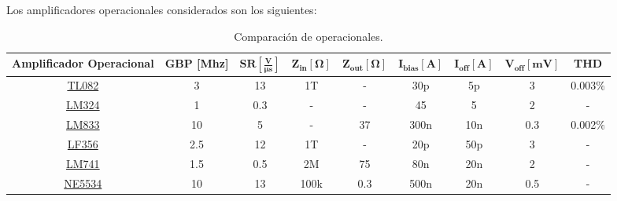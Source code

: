 Los amplificadores operacionales considerados son los siguientes:
\begin{table}[H]
\hspace*{-0.5cm}
\begin{tabular}{ccccccccc}
\hline
\textbf{Amplificador Operacional} & \textbf{GBP [Mhz]} & $\mathbf{SR [\frac{V}{\mu s}]}$ & $\mathbf{Z_{in} [\Omega]}$ & $\mathbf{Z_{out}[\Omega]}$ & $\mathbf{I_{bias}[A]}$ & $\mathbf{I_{off}[A]}$ & $\mathbf{V_{off}[mV]}$ & \textbf{THD} \\ \hline
\href{http://www.ti.com/lit/ds/symlink/tl082-n.pdf}{TL082}                   & 3                  & 13                              & 1T                         & -                          & 30p                 & 5p                    & 3                      & 0.003$\%$    \\
\href{http://www.ti.com/lit/ds/symlink/lm324-n.pdf}{LM324}                    & 1                  & 0.3                             & -                          & -                          & 45                  & 5                     & 2                      & -            \\
\href{http://www.ti.com/lit/ds/symlink/lm833.pdf}{LM833}                    & 10                 & 5                               & -                          & 37                         & 300n                & 10n                   & 0.3                    & 0.002$\%$    \\
\href{http://www.ti.com/lit/ds/symlink/lf356-mil.pdf}{LF356}                    & 2.5                & 12                              & 1T                         & -                          & 20p                 & 50p                   & 3                      & -            \\
\href{http://www.ti.com/lit/ds/symlink/lm741.pdf}{LM741}                    & 1.5                & 0.5                             & 2M                         & 75                         & 80n                 & 20n                   & 2                      & -            \\
\href{http://www.ti.com/lit/ds/slos070d/slos070d.pdf}{NE5534}                   & 10                 & 13                              & 100k                       & 0.3                        & 500n                & 20n                   & 0.5                    & -           \\
\hline
\end{tabular}
\caption{Comparación de operacionales.}
\end{table}

